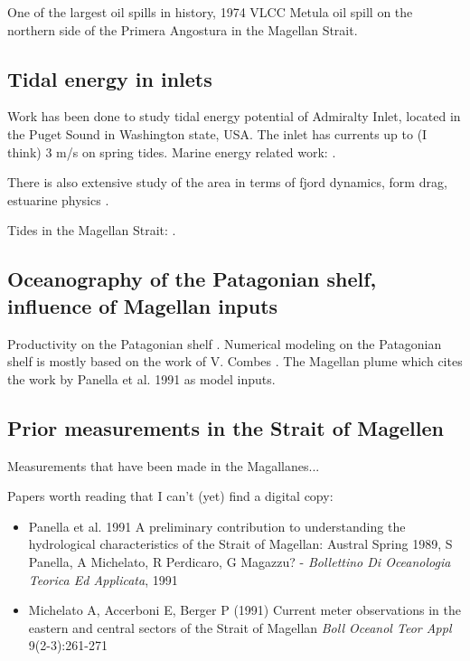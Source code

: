\documentclass[11pt, oneside]{article}   	%
\begin{document}
One of the largest oil spills in history, 1974 VLCC Metula oil spill on the northern side of the Primera Angostura in the Magellan Strait. 

\citep{iriarte18}

\subsection*{Tidal energy in inlets}

Work has been done to study tidal energy potential of Admiralty Inlet, located in the Puget Sound in Washington state, USA. The inlet has currents up to (I think) 3 m/s on spring tides. Marine energy related work: \citep{polagye13, kawasethyng10, thomson12, polagye09}. 

There is also extensive study of the area in terms of fjord dynamics, form drag, estuarine physics \citep[e.g.][]{warner13, geyer82}.


Tides in the Magellan Strait: \citep{conteras04, medeiros88}.

\subsection*{Oceanography of the Patagonian shelf, influence of Magellan inputs}
Productivity on the Patagonian shelf \citep{song16}. Numerical modeling on the Patagonian shelf is mostly based on the work of V. Combes \citep{combes14}. The Magellan plume \citep{palma12} which cites the work by Panella et al. 1991 as model inputs.

\subsection*{Prior measurements in the Strait of Magellen}
Measurements that have been made in the Magallanes... \citep{antezana99}

Papers worth reading that I can't (yet) find a digital copy: 

\begin{itemize}
\item Panella et al. 1991 A preliminary contribution to understanding the hydrological characteristics of the Strait of Magellan: Austral Spring 1989, S Panella, A Michelato, R Perdicaro, G Magazzu? - \textit{Bollettino Di Oceanologia Teorica Ed Applicata}, 1991

\item Michelato A, Accerboni E, Berger P (1991) Current meter observations in the eastern and central sectors of the Strait of Magellan \textit{Boll Oceanol Teor Appl} 9(2-3):261-271
\end{itemize}
\end{document}
